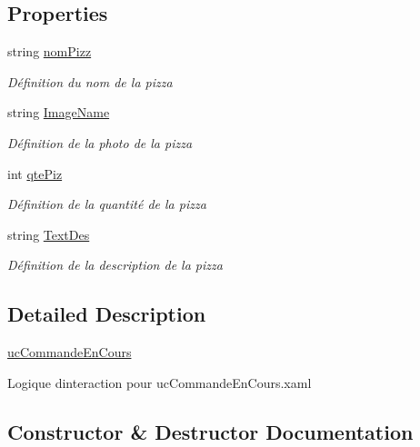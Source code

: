 \subsection*{Properties}
\begin{DoxyCompactItemize}
\item 
string \hyperlink{classnewPizza1_1_1ucCommandeEnCours_a50419dda293e2a59908e57f503d1c5e7}{nom\+Pizz}
\begin{DoxyCompactList}\small\item\em Définition du nom de la pizza \end{DoxyCompactList}\item 
string \hyperlink{classnewPizza1_1_1ucCommandeEnCours_ab40bde64de41c64202ce6a60224a839f}{Image\+Name}
\begin{DoxyCompactList}\small\item\em Définition de la photo de la pizza \end{DoxyCompactList}\item 
int \hyperlink{classnewPizza1_1_1ucCommandeEnCours_a64e153edc523ac0b96691e0b4e8eeb06}{qte\+Piz}
\begin{DoxyCompactList}\small\item\em Définition de la quantité de la pizza \end{DoxyCompactList}\item 
string \hyperlink{classnewPizza1_1_1ucCommandeEnCours_a952693cc0eeab854bf84328465b7689d}{Text\+Des}
\begin{DoxyCompactList}\small\item\em Définition de la description de la pizza \end{DoxyCompactList}\end{DoxyCompactItemize}


\subsection{Detailed Description}
\hyperlink{classnewPizza1_1_1ucCommandeEnCours}{uc\+Commande\+En\+Cours} 

Logique d\textquotesingle{}interaction pour uc\+Commande\+En\+Cours.\+xaml 

\subsection{Constructor \& Destructor Documentation}
\mbox{\label{classnewPizza1_1_1ucCommandeEnCours_a4076cbc30b75ea9e7894c9688668f616}} 
